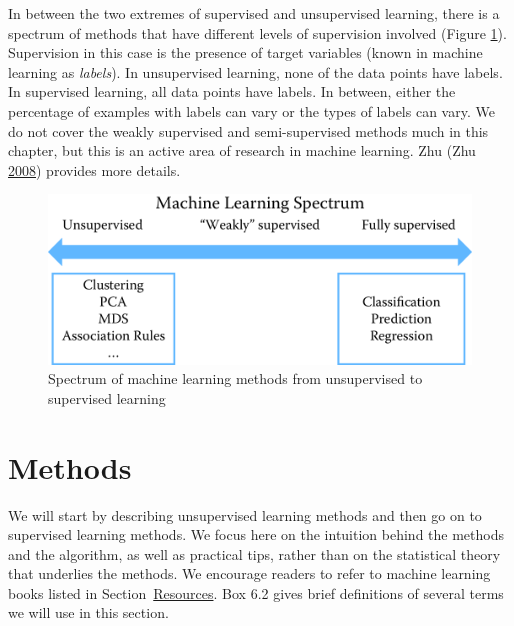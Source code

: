 \documentclass[]{krantz}
\begin{document}
In between the two extremes of supervised and unsupervised learning,
there is a spectrum of methods that have different levels of supervision
involved (Figure \ref{fig:spectrum}). Supervision in this case is the
presence of target variables (known in machine learning as
\emph{labels}). In unsupervised learning, none of the data points have
labels. In supervised learning, all data points have labels. In between,
either the percentage of examples with labels can vary or the types of
labels can vary. We do not cover the weakly supervised and
semi-supervised methods much in this chapter, but this is an active area
of research in machine learning. Zhu (Zhu
\protect\hyperlink{ref-zhu2005semi}{2008}) provides more details.

\begin{figure}

{\centering \includegraphics[width=0.7\linewidth]{ChapterML/figures/spectrum} 

}

\caption{Spectrum of machine learning methods from unsupervised to supervised learning}\label{fig:spectrum}
\end{figure}

\section{Methods}\label{methods}

We will start by describing unsupervised learning methods and then go on
to supervised learning methods. We focus here on the intuition behind
the methods and the algorithm, as well as practical tips, rather than on
the statistical theory that underlies the methods. We encourage readers
to refer to machine learning books listed in
Section~\protect\hyperlink{ml:res}{Resources}. Box 6.2 gives brief
definitions of several terms we will use in this section.
\end{document}
